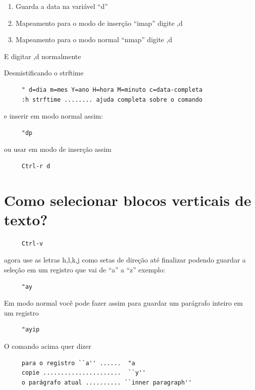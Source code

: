 \documentclass[10pt,a4paper,openany]{book}
\begin{document}
\begin{enumerate}
 \item  Guarda a data na variável ``d''
 \item  Mapeamento para o modo de inserção ``imap'' digite ,d
 \item  Mapeamento para o modo normal ``nmap'' digite ,d
\end{enumerate}

E digitar ,d normalmente

Desmistificando o strftime
\begin{verbatim}
     " d=dia m=mes Y=ano H=hora M=minuto c=data-completa
     :h strftime ........ ajuda completa sobre o comando
\end{verbatim}

e inserir em modo normal assim:

\begin{verbatim}
     "dp
\end{verbatim}

ou usar em modo de inserção assim

\begin{verbatim}
     Ctrl-r d
\end{verbatim}

\section{Como selecionar blocos verticais de texto?}
\label{Como selecionar blocos verticais de texto?}

\begin{verbatim}
     Ctrl-v
\end{verbatim}

agora use as letras h,l,k,j como setas de direção até finalizar
podendo guardar a seleção em um registro que vai de ``a'' a ``z'' exemplo:

\begin{verbatim}
     "ay
\end{verbatim}

Em modo normal você pode fazer assim para guardar um parágrafo inteiro em um registro

\begin{verbatim}
     "ayip
\end{verbatim}

O comando acima quer dizer

\begin{verbatim}
     para o registro ``a'' ......  "a
     copie ......................  ``y''
     o parágrafo atual .......... ``inner paragraph''
\end{verbatim}
\end{document}
